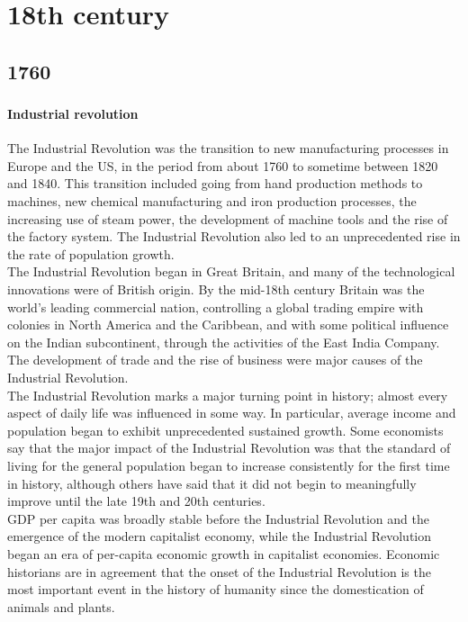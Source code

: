 \documentclass[11pt]{report}
\begin{document}
							
\part{18th century}
\chapter{1760}
\section{}
\subsection{Industrial revolution}
The Industrial Revolution was the transition to new manufacturing processes in Europe and the US, in the period from about 1760 to sometime between 1820 and 1840. This transition included going from hand production methods to machines, new chemical manufacturing and iron production processes, the increasing use of steam power, the development of machine tools and the rise of the factory system. The Industrial Revolution also led to an unprecedented rise in the rate of population growth.\\
\indent The Industrial Revolution began in Great Britain, and many of the technological innovations were of British origin. By the mid-18th century Britain was the world's leading commercial nation, controlling a global trading empire with colonies in North America and the Caribbean, and with some political influence on the Indian subcontinent, through the activities of the East India Company. The development of trade and the rise of business were major causes of the Industrial Revolution.\\
\indent The Industrial Revolution marks a major turning point in history; almost every aspect of daily life was influenced in some way. In particular, average income and population began to exhibit unprecedented sustained growth. Some economists say that the major impact of the Industrial Revolution was that the standard of living for the general population began to increase consistently for the first time in history, although others have said that it did not begin to meaningfully improve until the late 19th and 20th centuries.\\
\indent GDP per capita was broadly stable before the Industrial Revolution and the emergence of the modern capitalist economy, while the Industrial Revolution began an era of per-capita economic growth in capitalist economies. Economic historians are in agreement that the onset of the Industrial Revolution is the most important event in the history of humanity since the domestication of animals and plants.
\end{document}
